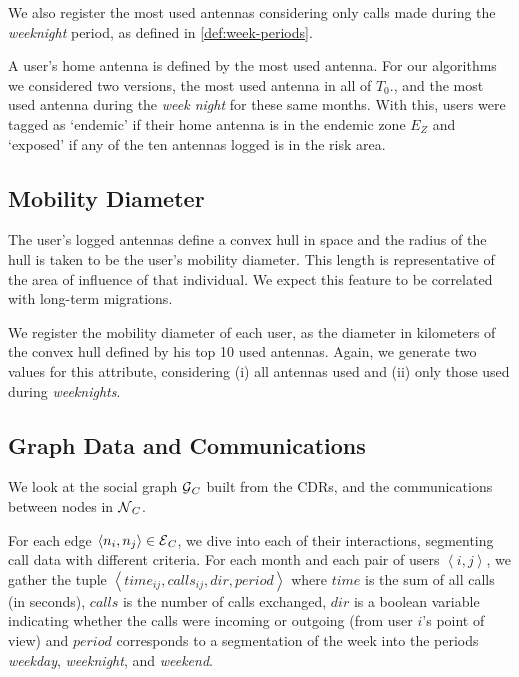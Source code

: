 We also register the most used antennas considering only calls made during the \textit{weeknight} period, as defined in \cref{def:week-periods}.

A user's home antenna is defined by the most used antenna.
For our algorithms we considered two versions, the most used antenna in all of $T_0$., and the most used antenna during the \textit{week night} for these same months.
With this, users were tagged as `endemic' if their home antenna is in the endemic zone $E_Z$ and `exposed' if any of the ten antennas logged is in the risk area.


\subsection{Mobility Diameter}\label{section:def_mobility_diameter}

The user's logged antennas define a convex hull in space and the radius of the hull is taken to be the user's mobility diameter.
This length is representative of the area of influence of that individual. 
We expect this feature to be correlated with long-term migrations.

We register the mobility diameter of each user, as the diameter in kilometers of the convex hull defined by his top 10 used antennas.
Again, we generate two values for this attribute, considering (i) all antennas used and (ii) only those used during \textit{weeknights}.



\subsection{Graph Data and Communications}\label{section:def_graph_data}

We look at the social graph $\operatorname{\mathcal{G}}_C$ built from the CDRs, and the communications between nodes in $\operatorname{\mathcal{N}}_C$.

For each edge $\left< n_i, n_j \right> \in \operatorname{\mathcal{E}}_C$, we dive into each of their interactions, segmenting call data with different criteria.
For each month and each pair of users $\left< i,j \right>$, we gather the tuple $\left< time_{ij}, calls_{ij}, dir, period \right>$ where $time$ is the sum of all calls (in seconds), $calls$ is the number of calls exchanged, $dir$ is a boolean variable indicating whether the calls were incoming or outgoing (from user $i$'s point of view) and $period$ corresponds to a segmentation of the week into the periods \textit{weekday}, \textit{weeknight}, and \textit{weekend}.


